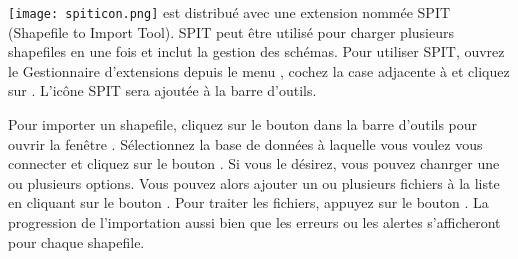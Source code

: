 \texttt{[image: spiticon.png]} \qg est distribué avec 
une extension nommée SPIT (Shapefile to \pg Import Tool). 
SPIT peut être utilisé pour charger plusieurs shapefiles en une fois et 
inclut la gestion des schémas. Pour utiliser SPIT, ouvrez le Gestionnaire 
d'extensions depuis le menu , cochez la case adjacente 
à  et cliquez sur . L'icône SPIT sera 
ajoutée à la barre d'outils.

Pour importer un shapefile, cliquez sur le bouton  
dans la barre d'outils pour ouvrir la fenêtre . Sélectionnez la base de données 
à laquelle vous voulez vous connecter et cliquez sur le bouton . 
Si vous le désirez, vous pouvez chanrger une ou plusieurs options. Vous 
pouvez alors ajouter un ou plusieurs fichiers à la liste en cliquant sur 
le bouton . Pour traiter les fichiers, appuyez sur le bouton 
. La progression de l'importation aussi bien que les erreurs ou 
les alertes s'afficheront pour chaque shapefile.

